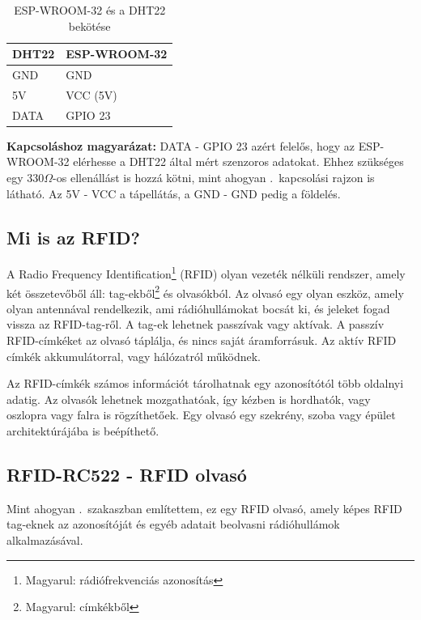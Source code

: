 \documentclass[
]{thesis-ekf}
\theoremstyle{definition}
\theoremstyle{remark}
\begin{document}
		\begin{table}[ht!]
			\centering
			\begin{tabular}{|l|l|}
				\hline
				\textbf{DHT22} & \textbf{ESP-WROOM-32} \\ \hline
				GND & GND \\ \hline
				5V  & VCC (5V) \\ \hline
				DATA & GPIO 23 \\ \hline
			\end{tabular}
			\caption{ESP-WROOM-32 és a DHT22 bekötése}
			\label{dht22-connection-table}
		\end{table}

	\textbf{Kapcsoláshoz magyarázat:}
	DATA - GPIO 23 azért felelős, hogy az ESP-WROOM-32 elérhesse a DHT22 által mért szenzoros adatokat. Ehhez szükséges egy 330$\Omega$-os ellenállást is hozzá kötni, mint ahogyan .~kapcsolási rajzon is látható. Az 5V - VCC a tápellátás, a GND - GND pedig a földelés.
	
	\subsection{Mi is az RFID?}\label{what-is-rfid}
	A Radio Frequency Identification\footnote{Magyarul: rádiófrekvenciás azonosítás} (RFID) olyan vezeték nélküli rendszer, amely két összetevőből áll: tag-ekből\footnote{Magyarul: címkékből} és olvasókból. Az olvasó egy olyan eszköz, amely olyan antennával rendelkezik, ami rádióhullámokat bocsát ki, és jeleket fogad vissza az RFID-tag-ről. A tag-ek lehetnek passzívak vagy aktívak. A passzív RFID-címkéket az olvasó táplálja, és nincs saját áramforrásuk. Az aktív RFID címkék akkumulátorral, vagy hálózatról működnek.
	
	Az RFID-címkék számos információt tárolhatnak egy azonosítótól több oldalnyi adatig. Az olvasók lehetnek mozgathatóak, így kézben is hordhatók, vagy oszlopra vagy falra is rögzíthetőek. Egy olvasó egy szekrény, szoba vagy épület architektúrájába is beépíthető.\cite{rfid-desc}
	
	\subsection{RFID-RC522 - RFID olvasó}\label{rfid-esp-section}
	Mint ahogyan .~szakaszban említettem, ez egy RFID olvasó, amely képes RFID tag-eknek az azonosítóját és egyéb adatait beolvasni rádióhullámok alkalmazásával.
\end{document}
